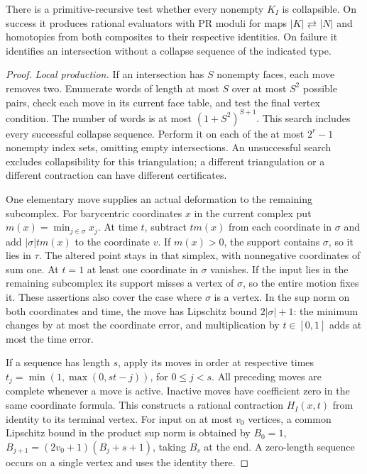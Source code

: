 \begin{theorem}\label{thm:collapse-nerve}
There is a primitive-recursive test whether every nonempty $K_I$ is
collapsible. On success it produces rational evaluators with PR moduli
for maps $|K|\rightleftarrows |N|$ and homotopies from both composites to
their respective identities. On failure it identifies an intersection
without a collapse sequence of the indicated type.
\end{theorem}
\begin{proof}
\emph{Local production.}
If an intersection has $S$ nonempty faces, each move removes two.
Enumerate words of length at most $S$ over at most $S^2$ possible
pairs, check each move in its current face table, and test the final
vertex condition. The number of words is at most $(1+S^2)^{S+1}$.
This search includes every successful collapse sequence. Perform it on
each of the at most $2^r-1$ nonempty index sets, omitting empty
intersections. An unsuccessful search excludes collapsibility for this
triangulation; a different triangulation or a different contraction
can have different certificates.

One elementary move supplies an actual deformation to the remaining
subcomplex. For barycentric coordinates $x$ in the current complex put
$m(x)=\min_{j\in\sigma}x_j$. At time $t$, subtract $t m(x)$ from each
coordinate in $\sigma$ and add $|\sigma|t m(x)$ to the coordinate $v$.
If $m(x)>0$, the support contains $\sigma$, so it lies in $\tau$.
The altered point stays in that simplex, with nonnegative coordinates
of sum one. At $t=1$ at least one coordinate in $\sigma$ vanishes. If
the input lies in the remaining subcomplex its support misses a vertex
of $\sigma$, so the entire motion fixes it. These assertions also cover
the case where $\sigma$ is a vertex. In the sup norm on both coordinates
and time, the move has Lipschitz bound $2|\sigma|+1$: the minimum changes
by at most the coordinate error, and multiplication by $t\in[0,1]$
adds at most the time error.

If a sequence has length $s$, apply its moves in order at respective
times $t_j=\min(1,\max(0,st-j))$, for $0\le j<s$.
All preceding moves are complete whenever a move is active. Inactive
moves have coefficient zero in the same coordinate formula. This
constructs a rational contraction $H_I(x,t)$ from identity to its
terminal vertex. For input on at most $v_0$ vertices, a common
Lipschitz bound in the product sup norm is obtained by $B_0=1$,
$B_{j+1}=(2v_0+1)(B_j+s+1)$, taking $B_s$ at the end. A zero-length
sequence occurs on a single vertex and uses the identity there.


\end{proof}
